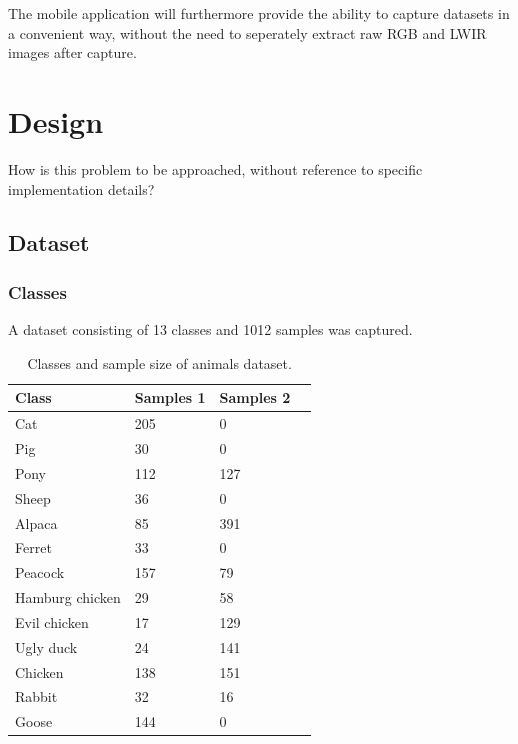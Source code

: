 \documentclass{l4proj}
\begin{document}
The mobile application will furthermore provide the ability to capture datasets in a convenient way, without the need to seperately extract raw RGB and LWIR images after capture.


\chapter{Design}
How is this problem to be approached, without reference to specific implementation details? 


\section{Dataset}

\subsection{Classes}

A dataset consisting of 13 classes and 1012 samples was captured. 

\begin{table}[ht]
  \centering
  \begin{tabular}{@{}ll@{}ll@{}}
    \toprule
    \textbf{Class}  & \textbf{Samples 1 } & \textbf{Samples 2} \\ \midrule
    Cat             & 205              & 0 \\
    Pig             & 30               & 0 \\
    Pony            & 112              & 127 \\
    Sheep           & 36               & 0 \\
    Alpaca          & 85               & 391 \\
    Ferret          & 33               & 0 \\
    Peacock         & 157              & 79 \\
    Hamburg chicken & 29               & 58 \\
    Evil chicken    & 17               & 129 \\
    Ugly duck       & 24               & 141 \\
    Chicken         & 138              & 151 \\
    Rabbit          & 32               & 16 \\
    Goose           & 144              & 0 \\ \bottomrule
  \end{tabular}
  \caption{Classes and sample size of animals dataset.}
  \label{table:dataset}
\end{table}
\end{document}
